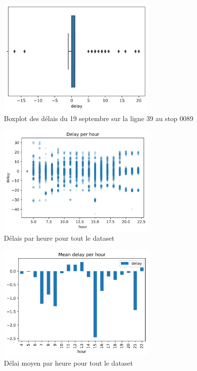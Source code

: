 \begin{appendices}
    \begin{figure}[ht]
        \centering
        \includegraphics[width=0.7\textwidth]{images/boxplot.png}
        \caption{Boxplot des délais du 19 septembre sur la ligne 39 au stop 0089}
        \label{appendix:boxplot}
    \end{figure}

    \begin{figure}[ht]
        \centering
        \includegraphics[width=0.7\textwidth]{images/delay_per_hour.png}
        \caption{Délais par heure pour tout le dataset}
        \label{appendix:delay_per_hour}
    \end{figure}

    \begin{figure}[ht]
        \centering
        \includegraphics[width=0.7\textwidth]{images/mean_delay_per_hour.png}
        \caption{Délai moyen par heure pour tout le dataset}
        \label{appendix:mean_delay_per_hour}
    \end{figure}


\end{appendices}

